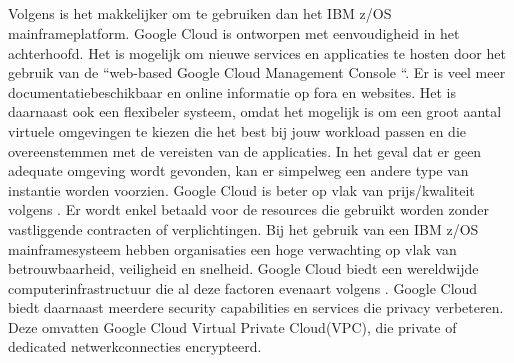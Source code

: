 \subsection{}
\label{sec:De voordelen van migreren naar Google Cloud volgens Astadia}

Volgens \citeauthor{Astadia2021} is het makkelijker om te gebruiken dan het IBM z/OS mainframeplatform. Google Cloud is ontworpen met eenvoudigheid in het achterhoofd. Het is mogelijk om nieuwe services en applicaties te hosten door het gebruik van de ``web-based Google Cloud Management Console ``.  Er is veel meer documentatiebeschikbaar en online informatie op fora en websites. Het is daarnaast ook een flexibeler systeem, omdat het mogelijk is om een groot aantal virtuele omgevingen te kiezen die het best bij jouw workload passen en die overeenstemmen met de vereisten van de applicaties. In het geval dat er geen adequate omgeving wordt gevonden, kan er simpelweg een andere type van instantie worden voorzien. Google Cloud is beter op vlak van prijs/kwaliteit volgens \citeauthor{Astadia2021}. Er wordt enkel betaald voor de resources die gebruikt worden zonder vastliggende contracten of verplichtingen. Bij het gebruik van een IBM z/OS mainframesysteem hebben organisaties een hoge verwachting op vlak van betrouwbaarheid, veiligheid en snelheid. Google Cloud biedt een wereldwijde computerinfrastructuur die al deze factoren evenaart volgens \citeauthor{Astadia2021}. Google Cloud biedt daarnaast meerdere security capabilities en services  die privacy verbeteren. Deze omvatten Google Cloud Virtual Private Cloud(VPC), die private of dedicated netwerkconnecties encrypteerd. 

\subsection{}
\label{sec:Welke workloads kunnen gemigreerd worden naar de cloud?}

